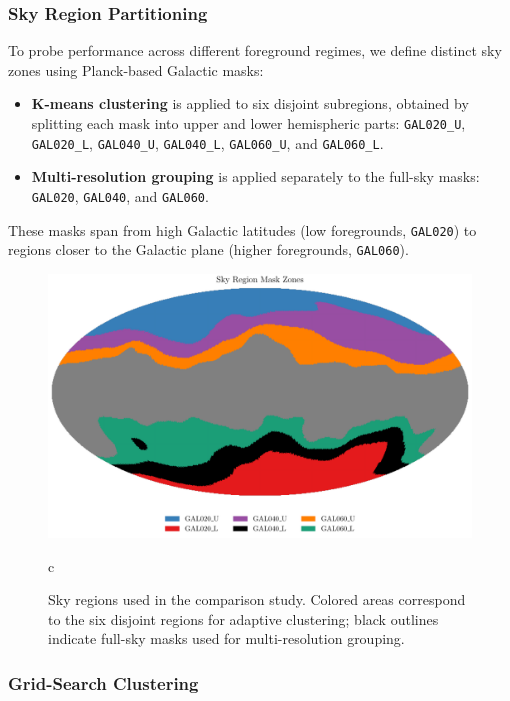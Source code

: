 \documentclass[%
 reprint,
bibnotes,
 amsmath,amssymb,
 aps,
floatfix, 
]{revtex4-2}
\begin{document}
\subsubsection*{Sky Region Partitioning}

To probe performance across different foreground regimes, we define distinct sky zones using Planck-based Galactic masks:

\begin{itemize}
    \item \textbf{K-means clustering} is applied to six disjoint subregions, obtained by splitting each mask into upper and lower hemispheric parts: \texttt{GAL020\_U}, \texttt{GAL020\_L}, \texttt{GAL040\_U}, \texttt{GAL040\_L}, \texttt{GAL060\_U}, and \texttt{GAL060\_L}.
    \item \textbf{Multi-resolution grouping} is applied separately to the full-sky masks: \texttt{GAL020}, \texttt{GAL040}, and \texttt{GAL060}.
\end{itemize}

These masks span from high Galactic latitudes (low foregrounds, \texttt{GAL020}) to regions closer to the Galactic plane (higher foregrounds, \texttt{GAL060}).

\begin{figure}[H]
    \centering
    \includegraphics[width=\linewidth]{figures/sky_region_mask_zones.pdf}
    \caption{
    Sky regions used in the comparison study. 
    Colored areas correspond to the six disjoint regions for adaptive clustering; black outlines indicate full-sky masks used for multi-resolution grouping.}c
    \label{fig:mask_layout}
\end{figure}

\subsubsection*{Grid-Search Clustering}
\end{document}
